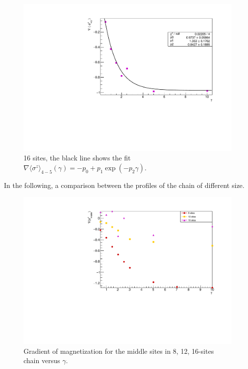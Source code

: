 \begin{figure}[H]
    \centering
    \includegraphics[scale=0.7]{Figures/16sites/FIT_16sites_gradLM45VSgamma.pdf}
    \caption{16 sites, the black line shows the fit \\$\nabla \langle\sigma^z\rangle_{4-5}(\gamma) = -p_0+p_1\exp{(-p_2\gamma)}$.}
    \label{fig:FIT_16sites_gradLM45VSgamma}
\end{figure}

In the following, a comparison between the profiles of the chain of different size.

\begin{figure}[H]
    \centering
    \includegraphics[scale=0.7]{Figures/gradLMvsGammavsSize.pdf}
    \caption{Gradient of magnetization for the middle sites in 8, 12, 16-sites chain versus $\gamma$.}
    \label{fig:gradLMvsGammavsSize}
\end{figure}

